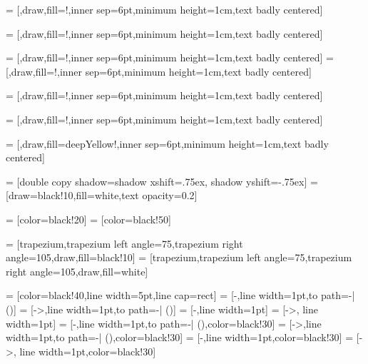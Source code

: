  = [\procShape,draw,fill=\optimizationColor!\fillOpacity,inner sep=6pt,minimum height=1cm,text badly centered]

 = [\groupShape,draw,fill=\optimizationColor!\fillOpacity,inner sep=6pt,minimum height=1cm,text badly centered]

 = [\groupShape,draw,fill=\customColor!\fillOpacity,inner sep=6pt,minimum height=1cm,text badly centered]
 = [\groupShape,draw,fill=\implicitColor!\fillOpacity,inner sep=6pt,minimum height=1cm,text badly centered]

 = [\funcShape,draw,fill=\FuncFluidColor!\fillOpacityTwo,inner sep=6pt,minimum height=1cm,text badly centered]

 = [\funcShape,draw,fill=\FuncSolidColor!\fillOpacityTwo,inner sep=6pt,minimum height=1cm,text badly centered]


 = [\compShape,draw,fill=deepYellow!\fillOpacity,inner sep=6pt,minimum height=1cm,text badly centered]

 = [double copy shadow={shadow xshift=.75ex, shadow yshift=-.75ex}]
 = [draw=black!10,fill=white,text opacity=0.2]

 = [color=black!20]
 = [color=black!50]

\newcommand{\dataRightAngle}{105}
\newcommand{\dataLeftAngle}{75}

 = [trapezium,trapezium left angle=\dataLeftAngle,trapezium right angle=\dataRightAngle,draw,fill=black!10]
 = [trapezium,trapezium left angle=\dataLeftAngle,trapezium right angle=\dataRightAngle,draw,fill=white]

 = [color=black!40,line width=5pt,line cap=rect]
 = [-,line width=1pt,to path={-| (\tikztotarget)}]
 = [->,line width=1pt,to path={-| (\tikztotarget)}]
 = [-,line width=1pt]
 = [->, line width=1pt]
 = [-,line width=1pt,to path={-| (\tikztotarget)},color=black!30]
 = [->,line width=1pt,to path={-| (\tikztotarget)},color=black!30]
 = [-,line width=1pt,color=black!30]
 = [->, line width=1pt,color=black!30]

